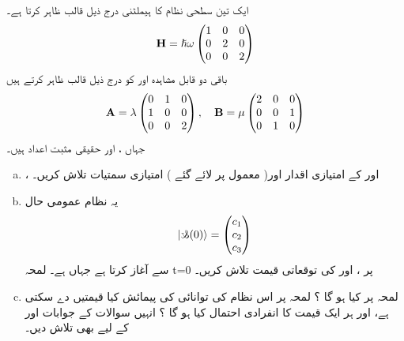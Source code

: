 ایک تین سطحی نظام کا ہیملٹنی درج ذیل قالب ظاہر کرتا ہے۔ 
 \begin{align*} 
\bold{H}=\hslash\omega\begin{pmatrix}
1&0&0\\
0&2&0\\
0&0&2
\end{pmatrix} 
 \end{align*} 
باقی دو قابل مشاہدہ  اور  کو درج ذیل قالب ظاہر کرتے ہیں 
 \begin{align*} 
\bold{A}=\lambda\begin{pmatrix}
0&1&0\\
1&0&0\\
0&0&2
\end{pmatrix} ,\quad \bold{B}=\mu\begin{pmatrix}
2&0&0\\
0&0&1\\
0&1&0
\end{pmatrix}
 \end{align*} 
جہاں ،  اور  حقیقی مثبت اعداد ہیں۔
\begin{enumerate}[a.]
\item
{}،  اور  کے امتیازی اقدار اور( معمول پر لائے گئے ) امتیازی سمتیات تلاش کریں۔ 
 \item
 یہ نظام عمومی حال
 \begin{align*} 
| \s(0) \rangle=\begin{pmatrix}
c_{1}\\
c_{2}\\
c_{3}
\end{pmatrix} 
 \end{align*} 
سے آغاز کرتا ہے جہاں  ہے۔ لمحہ t=0 پر ،  اور کی توقعاتی قیمت تلاش کریں۔ 
\item
 لمحہ  پر  کیا ہو گا ؟ لمحہ پر اس نظام کی توانائی کی پیمائش کیا قیمتیں دے سکتی ہے، اور ہر ایک قیمت کا انفرادی احتمال کیا ہو گا ؟ انہیں سوالات کے جوابات  اور  کے لیے بھی تلاش دیں۔
 \end{enumerate}

